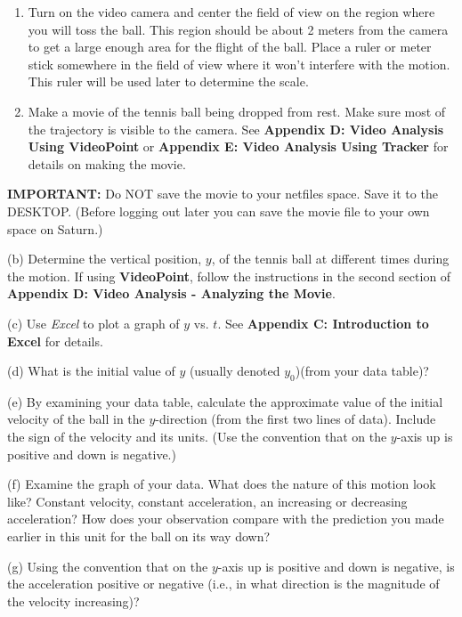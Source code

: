 \begin{enumerate}
\item Turn on the video camera and center the field of view on the region where you will toss the ball. This region should be about 2 meters from the camera to
get a large enough area for the flight of the ball. Place a ruler or meter stick somewhere in the field of view where it won't interfere with the motion. This
ruler will be used later to determine the scale. 
\item Make a movie of the tennis ball being dropped from rest. Make sure most of the trajectory is visible to the camera. See \textbf{Appendix D: Video Analysis Using VideoPoint} or \textbf{Appendix E: Video Analysis Using Tracker} for details on making the movie.
\end{enumerate}
\textbf{IMPORTANT:} Do NOT save the movie to your netfiles space.  Save it to the DESKTOP.  (Before logging out later you can save the movie file to your own space on Saturn.)
\vspace{5mm}

(b) Determine the vertical position, $y$, of the tennis ball at different times
during the motion. If using \textbf{VideoPoint}, follow the instructions in the second section of \textbf{Appendix D: Video Analysis - Analyzing the Movie}. 

(c) Use \textit{Excel} to plot a graph of $y$ vs. $t$. See \textbf{Appendix
C: Introduction to Excel} for details.

(d) What is the initial value of $y$ (usually denoted \( y_{0} \))(from your data table)? 
\vspace{10mm}

(e) By examining your data table, calculate the approximate value of the initial velocity of the ball in the $y$-direction (from the first two lines of data). Include the sign of the velocity and its units. (Use the convention that on the $y$-axis up is positive and down is negative.)
\vspace{20mm}

(f) Examine the graph of your data. What does the nature of this motion look
like? Constant velocity, constant acceleration, an increasing or decreasing
acceleration? How does your observation compare with the prediction you made
earlier in this unit for the ball on its way down?
\vspace{20mm}

(g) Using the convention that on the $y$-axis up is positive and down is negative, is the acceleration positive or negative (i.e., in what direction is the magnitude of the velocity increasing)?
\vspace{20mm}

